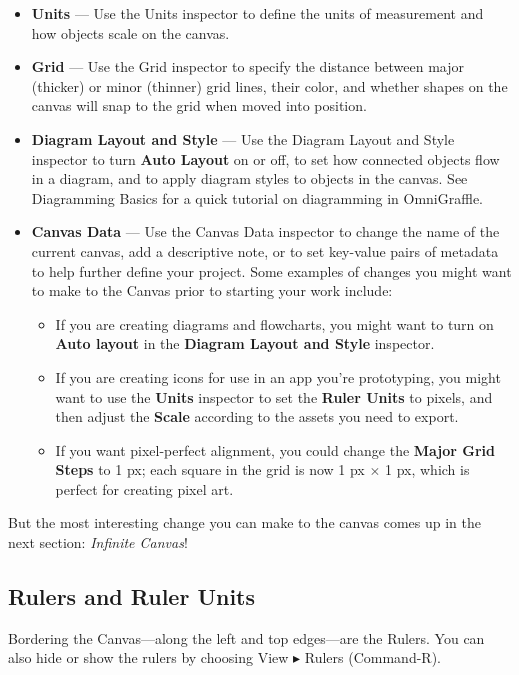 \documentclass[../main.tex]{subfiles}
\begin{document}
\begin{itemize}
  \item \textbf{Units} — Use the Units inspector to define the units of measurement and how
    objects scale
    on the canvas.
  \item \textbf{Grid} — Use the Grid inspector to specify the distance between major (thicker)
    or minor (thinner) grid
    lines, their color, and whether shapes on the canvas will snap to the grid when moved into
    position.
  \item \textbf{Diagram Layout and Style} — Use the Diagram Layout and Style inspector to turn
    \textbf{Auto
    Layout} on or off,
    to set how connected objects flow in a diagram, and to apply diagram styles to objects in
    the canvas.
    See Diagramming Basics for a quick tutorial on diagramming in OmniGraffle.
  \item \textbf{Canvas Data} — Use the Canvas Data inspector to change the name of the current
    canvas, add a
    descriptive note, or to set key-value pairs of metadata to help further define your project.
    Some examples of changes you might want to make to the Canvas prior to starting your work
    include:
    \begin{itemize}
      \item If you are creating diagrams and flowcharts, you might want to turn on \textbf{Auto
        layout} in
        the \textbf{Diagram Layout and Style} inspector.
      \item If you are creating icons for use in an app you're prototyping, you might want to
        use the
        \textbf{Units}
        inspector to set the \textbf{Ruler Units} to pixels, and then adjust the \textbf{Scale}
        according to
        the assets you
        need to export.
      \item If you want pixel-perfect alignment, you could change the \textbf{Major Grid Steps}
        to 1
        px; each square
        in the grid is now 1 px $\times$ 1 px, which is perfect for creating pixel art.
    \end{itemize}
\end{itemize}
But the most interesting change you can make to the canvas comes up in the next section:
\textit{Infinite Canvas}!

\subsection{Rulers and Ruler Units}
Bordering the Canvas—along the left and top edges—are the Rulers. You can also hide or show the
rulers by
choosing View $\blacktriangleright$ Rulers (Command-R).
\end{document}
